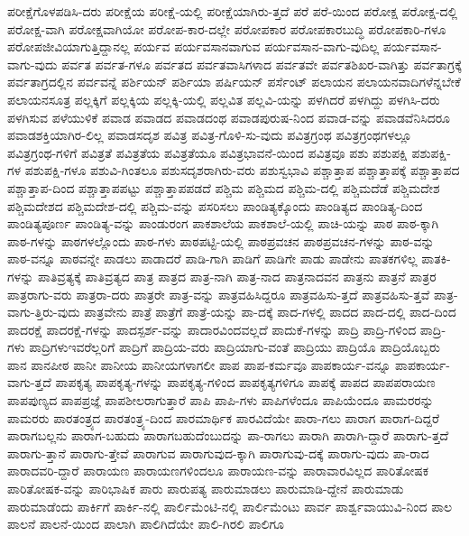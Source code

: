 {ಪರೀಕ್ಷೆಗೊಳಪಡಿಸಿ-ದರು
ಪರೀಕ್ಷೆಯ
ಪರೀಕ್ಷೆ-ಯಲ್ಲಿ
ಪರೀಕ್ಷೆಯಾಗಿರು-ತ್ತದೆ
ಪರೆ
ಪರೆ-ಯಿಂದ
ಪರೋಕ್ಷ
ಪರೋಕ್ಷ-ದಲ್ಲಿ
ಪರೋಕ್ಷ-ವಾಗಿ
ಪರೋಕ್ಷವಾಗಿಯೋ
ಪರೋಪ-ಕಾರ-ದಲ್ಲೇ
ಪರೋಪಕಾರ
ಪರೋಪಕಾರಬುದ್ಧಿ
ಪರೋಪಕಾರಿ-ಗಳೂ
ಪರೋಪಜೀವಿಯಾಗುತ್ತಿದ್ದಾನಲ್ಲ
ಪರ್ಯವ
ಪರ್ಯವಸಾನವಾಗುವ
ಪರ್ಯವಸಾನ-ವಾಗು-ವುದಿಲ್ಲ
ಪರ್ಯವಸಾನ-ವಾಗು-ವುದು
ಪರ್ವತ
ಪರ್ವತ-ಗಳೂ
ಪರ್ವತದ
ಪರ್ವತವಾಸಿಗಳಾದ
ಪರ್ವತವೇ
ಪರ್ವತಶಿಖರ-ವಾಗಿತ್ತು
ಪರ್ವತಾಗ್ರಕ್ಕೆ
ಪರ್ವತಾಗ್ರದಲ್ಲಿನ
ಪರ್ವವನ್ನೆ
ಪರ್ಶಿಯನ್
ಪರ್ಶಿಯಾ
ಪರ್ಷಿಯನ್
ಪರ್ಸೆಂಟ್
ಪಲಾಯನ
ಪಲಾಯನವಾದಿಗಳೆನ್ನಬೇಕೆ
ಪಲಾಯನಸೂತ್ರ
ಪಲ್ಲಕ್ಕಿಗೆ
ಪಲ್ಲಕ್ಕಿಯ
ಪಲ್ಲಕ್ಕಿ-ಯಲ್ಲಿ
ಪಲ್ಲವಿತ
ಪಲ್ಲವಿ-ಯನ್ನು
ಪಳಗಿದರೆ
ಪಳಗಿದ್ದು
ಪಳಗಿಸಿ-ದರು
ಪಳಗಿಸುವ
ಪಳೆಯುಳಿಕೆ
ಪವಾಡ
ಪವಾಡದ
ಪವಾಡದಂಥ
ಪವಾಡಪುರುಷ-ನಿಂದ
ಪವಾಡ-ವನ್ನು
ಪವಾಡವೆನಿಸಿದರೂ
ಪವಾಡಶಕ್ತಿಯಾಗಿರ-ಲಿಲ್ಲ
ಪವಾಡಸದೃಶ
ಪವಿತ್ರ
ಪವಿತ್ರ-ಗೊಳಿ-ಸು-ವುದು
ಪವಿತ್ರಗ್ರಂಥ
ಪವಿತ್ರಗ್ರಂಥಗಳಲ್ಲೂ
ಪವಿತ್ರಗ್ರಂಥ-ಗಳಿಗೆ
ಪವಿತ್ರತೆ
ಪವಿತ್ರತೆಯ
ಪವಿತ್ರತೆಯೂ
ಪವಿತ್ರಭಾವನೆ-ಯಿಂದ
ಪವಿತ್ರವೂ
ಪಶು
ಪಶುಪಕ್ಷಿ
ಪಶುಪಕ್ಷಿ-ಗಳ
ಪಶುಪಕ್ಷಿ-ಗಳೂ
ಪಶುವಿ-ಗಿಂತಲೂ
ಪಶುಸದೃಶರಾಗಿರು-ವರು
ಪಶುಸ್ವಭಾವಿ
ಪಶ್ಚಾತ್ತಾಪ
ಪಶ್ಚಾತ್ತಾಪಕ್ಕೆ
ಪಶ್ಚಾತ್ತಾಪದ
ಪಶ್ಚಾತ್ತಾಪ-ದಿಂದ
ಪಶ್ಚಾತ್ತಾಪಪಟ್ಟು
ಪಶ್ಚಾತ್ತಾಪಪಡದೆ
ಪಶ್ಚಿಮ
ಪಶ್ಚಿಮದ
ಪಶ್ಚಿಮ-ದಲ್ಲಿ
ಪಶ್ಚಿಮದೆಡೆ
ಪಶ್ಚಿಮದೇಶ
ಪಶ್ಚಿಮದೇಶದ
ಪಶ್ಚಿಮದೇಶ-ದಲ್ಲಿ
ಪಶ್ಚಿಮ-ವನ್ನು
ಪಸರಿಸಲು
ಪಾಂಡಿತ್ಯಕ್ಕೊಂದು
ಪಾಂಡಿತ್ಯದ
ಪಾಂಡಿತ್ಯ-ದಿಂದ
ಪಾಂಡಿತ್ಯಪೂರ್ಣ
ಪಾಂಡಿತ್ಯ-ವನ್ನು
ಪಾಂಡುರಂಗ
ಪಾಕಶಾಲೆಯ
ಪಾಕಶಾಲೆ-ಯಲ್ಲಿ
ಪಾಚಿ-ಯನ್ನು
ಪಾಠ
ಪಾಠ-ಕ್ಕಾಗಿ
ಪಾಠ-ಗಳನ್ನು
ಪಾಠಗಳಲ್ಲೊಂದು
ಪಾಠ-ಗಳು
ಪಾಠಪಟ್ಟಿ-ಯಲ್ಲಿ
ಪಾಠಪ್ರವಚನ
ಪಾಠಪ್ರವಚನ-ಗಳನ್ನು
ಪಾಠ-ವನ್ನು
ಪಾಠ-ವನ್ನೂ
ಪಾಠವನ್ನೇ
ಪಾಡಲು
ಪಾಡಾದರೆ
ಪಾಡಿ-ಗಾಗಿ
ಪಾಡಿಗೆ
ಪಾಡಿಗೇ
ಪಾಡು
ಪಾಡೇನು
ಪಾತಕಗಳಿಲ್ಲ
ಪಾತಕಿ-ಗಳನ್ನು
ಪಾತಿವ್ರತ್ಯಕ್ಕೆ
ಪಾತಿವ್ರತ್ಯದ
ಪಾತ್ರ
ಪಾತ್ರದ
ಪಾತ್ರ-ನಾಗಿ
ಪಾತ್ರ-ನಾದ
ಪಾತ್ರನಾದವನ
ಪಾತ್ರನು
ಪಾತ್ರನೆ
ಪಾತ್ರರ
ಪಾತ್ರರಾಗು-ವರು
ಪಾತ್ರರಾ-ದರು
ಪಾತ್ರರೇ
ಪಾತ್ರ-ವನ್ನು
ಪಾತ್ರವಹಿಸಿದ್ದರೂ
ಪಾತ್ರವಹಿಸು-ತ್ತದೆ
ಪಾತ್ರವಹಿಸು-ತ್ತವೆ
ಪಾತ್ರ-ವಾಗು-ತ್ತಿರು-ವುದು
ಪಾತ್ರವೇನು
ಪಾತ್ರೆ
ಪಾತ್ರೆಗೆ
ಪಾತ್ರೆ-ಯನ್ನು
ಪಾ-ದಕ್ಕೆ
ಪಾದ-ಗಳಲ್ಲಿ
ಪಾದದ
ಪಾದ-ದಲ್ಲಿ
ಪಾದ-ದಿಂದ
ಪಾದರಕ್ಷೆ
ಪಾದರಕ್ಷೆ-ಗಳನ್ನು
ಪಾದಸ್ಪರ್ಶ-ವನ್ನು
ಪಾದಾರವಿಂದವಲ್ಲದೆ
ಪಾದುಕೆ-ಗಳನ್ನು
ಪಾದ್ರಿ
ಪಾದ್ರಿ-ಗಳಿಂದ
ಪಾದ್ರಿ-ಗಳು
ಪಾದ್ರಿಗಳುಇವರೆಲ್ಲರಿಗೆ
ಪಾದ್ರಿಗೆ
ಪಾದ್ರಿಯ-ವರು
ಪಾದ್ರಿಯಾಗು-ವಂತೆ
ಪಾದ್ರಿಯು
ಪಾದ್ರಿಯೊ
ಪಾದ್ರಿಯೊಬ್ಬರು
ಪಾನ
ಪಾನಪೀಠ
ಪಾನೀ
ಪಾನೀಯ
ಪಾನೀಯಗಳಾಗಲೀ
ಪಾಪ
ಪಾಪ-ಕರ್ಮವೂ
ಪಾಪಕಾರ್ಯ-ವನ್ನೂ
ಪಾಪಕಾರ್ಯ-ವಾಗು-ತ್ತದೆ
ಪಾಪಕೃತ್ಯ
ಪಾಪಕೃತ್ಯ-ಗಳನ್ನು
ಪಾಪಕೃತ್ಯ-ಗಳಿಂದ
ಪಾಪಕೃತ್ಯಗಳಿಗೂ
ಪಾಪಕ್ಕೆ
ಪಾಪದ
ಪಾಪಪರಾಯಣ
ಪಾಪಪುಣ್ಯದ
ಪಾಪಪ್ರಜ್ಞೆ
ಪಾಪಶೀಲರಾಗುತ್ತಾರೆ
ಪಾಪಿ
ಪಾಪಿ-ಗಳು
ಪಾಪಿಗಳೆಂದೂ
ಪಾಪಿಯೆಂದೂ
ಪಾಮರರನ್ನು
ಪಾಮರರು
ಪಾರತಂತ್ರ್ಯದ
ಪಾರತಂತ್ರ್ಯ-ದಿಂದ
ಪಾರಮಾರ್ಥಿಕ
ಪಾರವಿದೆಯೇ
ಪಾರಾ-ಗಲು
ಪಾರಾಗ
ಪಾರಾಗ-ದಿದ್ದರೆ
ಪಾರಾಗಬಲ್ಲನು
ಪಾರಾಗ-ಬಹುದು
ಪಾರಾಗಬಹುದೆಂಬುದನ್ನು
ಪಾ-ರಾಗಲು
ಪಾರಾಗಿ
ಪಾರಾಗಿ-ದ್ದಾರೆ
ಪಾರಾಗು-ತ್ತದೆ
ಪಾರಾಗು-ತ್ತಾನೆ
ಪಾರಾಗು-ತ್ತೇವೆ
ಪಾರಾಗುವ
ಪಾರಾಗುವುದ-ಕ್ಕಾಗಿ
ಪಾರಾಗುವು-ದಕ್ಕೆ
ಪಾರಾಗು-ವುದು
ಪಾ-ರಾದ
ಪಾರಾದವರಿ-ದ್ದಾರೆ
ಪಾರಾಯಣ
ಪಾರಾಯಣಗಳಿಂದಲೂ
ಪಾರಾಯಣ-ವನ್ನು
ಪಾರಾವಾರವಿಲ್ಲದ
ಪಾರಿತೋಷಕ
ಪಾರಿತೋಷಕ-ವನ್ನು
ಪಾರಿಭಾಷಿಕ
ಪಾರು
ಪಾರುಪತ್ಯ
ಪಾರುಮಾಡಲು
ಪಾರುಮಾಡಿ-ದ್ದೇನೆ
ಪಾರುಮಾಡು
ಪಾರುಮಾಡೆಂದು
ಪಾರ್ಕಿಗೆ
ಪಾರ್ಕಿ-ನಲ್ಲಿ
ಪಾರ್ಲಿಮೆಂಟಿ-ನಲ್ಲಿ
ಪಾರ್ಲಿಮೆಂಟು
ಪಾರ್ವ
ಪಾರ್ಶ್ವವಾಯುವಿ-ನಿಂದ
ಪಾಲ
ಪಾಲನೆ
ಪಾಲನೆ-ಯಿಂದ
ಪಾಲಾಗಿ
ಪಾಲಿಗಿದೆಯೇ
ಪಾಲಿ-ಗಿರಲಿ
ಪಾಲಿಗೂ
}
